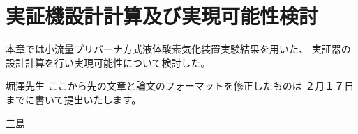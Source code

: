 \section{実証機設計計算及び実現可能性検討}
本章では小流量プリバーナ方式液体酸素気化装置実験結果を用いた、
実証器の設計計算を行い実現可能性について検討した。


堀澤先生
ここから先の文章と論文のフォーマットを修正したものは
２月１７日までに書いて提出いたします。

三島
